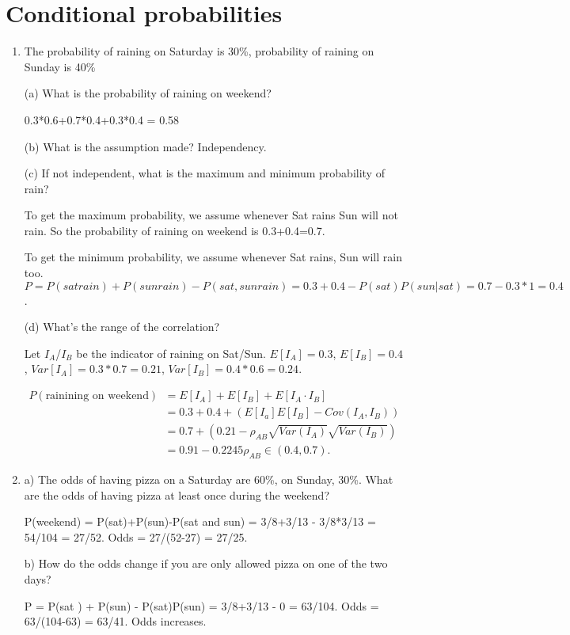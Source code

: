 \documentclass{article}
\begin{document}
\section{Conditional probabilities}
\begin{enumerate}
    \item The probability of raining on Saturday is 30\%, probability of raining on Sunday is 40\%
 
 (a) What is the probability of raining on weekend?

 0.3*0.6+0.7*0.4+0.3*0.4 = 0.58
 
 (b) What is the assumption made? Independency.
 
 (c) If not independent, what is the maximum and minimum probability of rain? 

 To get the maximum probability, we assume whenever Sat rains Sun will not rain. So the probability of raining on weekend is 0.3+0.4=0.7. 

 To get the minimum probability, we assume whenever Sat rains, Sun will rain too. $P=P(sat rain)+P(sun rain) - P(sat, sun rain) = 0.3+0.4-P(sat)P(sun|sat)=0.7-0.3*1=0.4$.

 (d) What's the range of the correlation?

 Let $I_A$/$I_B$ be the indicator of raining on Sat/Sun. $E[I_A]=0.3$, $E[I_B] = 0.4$, $Var[I_A]=0.3*0.7=0.21$, $Var[I_B]=0.4*0.6=0.24$.

 \begin{align*}
     P(\text{rainining on weekend}) &= E[I_A] + E[I_B] + E[I_A\cdot I_B] \\
     &= 0.3+0.4 + (E[I_a] E[I_B] - Cov(I_A, I_B)) \\
     &= 0.7 + \left(0.21-\rho_{AB}\sqrt{Var(I_A)}\sqrt{Var(I_B)}\right) \\
     &= 0.91-0.2245\rho_{AB} \in (0.4,0.7).
 \end{align*}

    
    
    \item a) The odds of having pizza on a Saturday are 60\%, on Sunday, 30\%. What are the odds of having pizza at least once during the weekend? 

     P(weekend) = P(sat)+P(sun)-P(sat and sun) = 3/8+3/13 - 3/8*3/13 = 54/104 = 27/52. Odds = 27/(52-27) = 27/25.
 
     b) How do the odds change if you are only allowed pizza on one of the two days?

     P = P(sat ) + P(sun) - P(sat)P(sun) = 3/8+3/13 - 0 = 63/104. Odds = 63/(104-63) = 63/41. Odds increases.
     

\end{enumerate}
\end{document}
